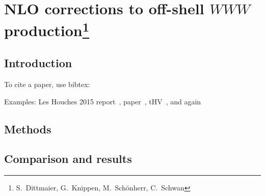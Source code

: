 \newcommand{\Herwig}{H\protect\scalebox{0.8}{ERWIG}\xspace}
\newcommand{\Pythia}{P\protect\scalebox{0.8}{YTHIA}\xspace}
\newcommand{\Sherpa}{S\protect\scalebox{0.8}{HERPA}\xspace}
\newcommand{\Rivet}{R\protect\scalebox{0.8}{IVET}\xspace}
\newcommand{\Recola}{R\protect\scalebox{0.8}{ECOLA}\xspace}
\newcommand{\Professor}{P\protect\scalebox{0.8}{ROFESSOR}\xspace}
\newcommand{\eps}{\varepsilon}
\newcommand{\mc}[1]{\mathcal{#1}}
\newcommand{\mr}[1]{\mathrm{#1}}
\newcommand{\mb}[1]{\mathbb{#1}}
\newcommand{\tm}[1]{\scalebox{0.95}{$#1$}}

\section{NLO corrections to off-shell $WWW$ production\protect\footnote{
  S.~Dittmaier,
  G.~Knippen,
  M.~Sch{\"o}nherr,
  C.~Schwan}{}}

\label{sec:WWW}


\subsection{Introduction}
\label{sec:WWW:intro}

To cite a paper, use bibtex:

Examples: Les Houches 2015 report~\cite{Badger:2016bpw},
paper~\cite{Aaboud:2016ffv}, tHV~\cite{'tHooft:1972fi}, and again~\cite{'tHooft:1972fi}


\subsection{Methods}
\label{sec:WWW:methods}

\subsection{Comparison and results}
\label{sec:WWW:comparison}

